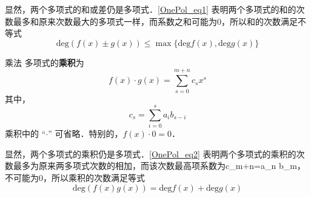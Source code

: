 显然，两个多项式的和或差仍是多项式．\autoref{OnePol_eq1} 表明两个多项式的和的次数最多和原来次数最大的多项式一样，而系数之和可能为0，所以和的次数满足不等式
\begin{equation}
\mathrm{deg}(f(x)\pm g(x))\leq \max\{\mathrm{deg}f(x),\mathrm{deg}g(x)\}
\end{equation}
\begin{definition}{乘法}
多项式的\textbf{乘积}为
\begin{equation}
f(x)\cdot g(x)=\sum_{s=0}^{m+n} c_s x^s
\label{OnePol_eq2}
\end{equation}
其中，
\begin{equation}
c_s=\sum_{i=0}^s a_i b_{s-i}
\end{equation}
乘积中的 “$\cdot$” 可省略．特别的，$f(x)\cdot 0=0$．
\end{definition}

显然，两个多项式的乘积仍是多项式．\autoref{OnePol_eq2} 表明两个多项式的乘积的次数最多为原来两多项式次数的相加，而该次数最高项系数为c_{m+n}=a_n b_m，不可能为0，所以乘积的次数满足等式
\begin{equation}
\mathrm{deg}(f(x)g(x))= \mathrm{deg}f(x)+\mathrm{deg}g(x)
\end{equation}